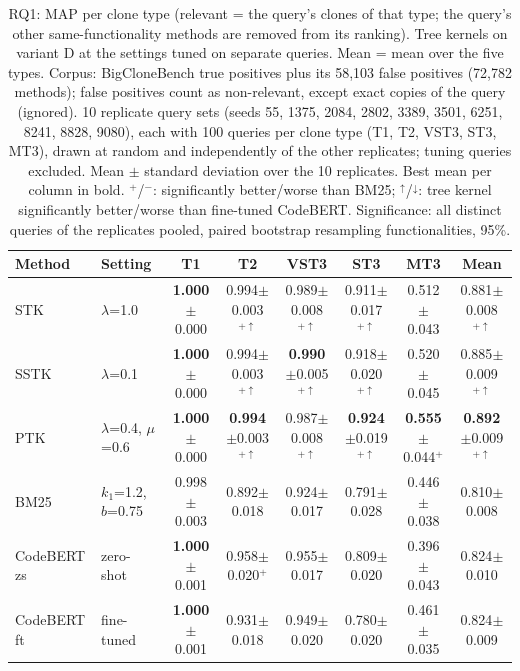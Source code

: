 \begin{table}[t]
\centering
\caption{RQ1: MAP per clone type (relevant = the query's clones of that type; the query's other same-functionality methods are removed from its ranking). Tree kernels on variant D at the settings tuned on separate queries. Mean = mean over the five types. Corpus: BigCloneBench true positives plus its 58,103 false positives (72,782 methods); false positives count as non-relevant, except exact copies of the query (ignored). 10 replicate query sets (seeds 55, 1375, 2084, 2802, 3389, 3501, 6251, 8241, 8828, 9080), each with 100 queries per clone type (T1, T2, VST3, ST3, MT3), drawn at random and independently of the other replicates; tuning queries excluded. Mean $\pm$ standard deviation over the 10 replicates. Best mean per column in bold. $^{+}$/$^{-}$: significantly better/worse than BM25; $^{\uparrow}$/$^{\downarrow}$: tree kernel significantly better/worse than fine-tuned CodeBERT. Significance: all distinct queries of the replicates pooled, paired bootstrap resampling functionalities, 95\%.}
\label{tab:rq1}
\footnotesize
\setlength{\tabcolsep}{3.5pt}
\begin{tabular}{llcccccc}
\toprule
Method & Setting & T1 & T2 & VST3 & ST3 & MT3 & Mean \\
\midrule
STK & $\lambda$=1.0 & \textbf{1.000}$\pm$0.000 & 0.994$\pm$0.003$^{+\uparrow}$ & 0.989$\pm$0.008$^{+\uparrow}$ & 0.911$\pm$0.017$^{+\uparrow}$ & 0.512$\pm$0.043 & 0.881$\pm$0.008$^{+\uparrow}$ \\
SSTK & $\lambda$=0.1 & \textbf{1.000}$\pm$0.000 & 0.994$\pm$0.003$^{+\uparrow}$ & \textbf{0.990}$\pm$0.005$^{+\uparrow}$ & 0.918$\pm$0.020$^{+\uparrow}$ & 0.520$\pm$0.045 & 0.885$\pm$0.009$^{+\uparrow}$ \\
PTK & $\lambda$=0.4, $\mu$=0.6 & \textbf{1.000}$\pm$0.000 & \textbf{0.994}$\pm$0.003$^{+\uparrow}$ & 0.987$\pm$0.008$^{+\uparrow}$ & \textbf{0.924}$\pm$0.019$^{+\uparrow}$ & \textbf{0.555}$\pm$0.044$^{+}$ & \textbf{0.892}$\pm$0.009$^{+\uparrow}$ \\
\midrule
BM25 & $k_1$=1.2, $b$=0.75 & 0.998$\pm$0.003 & 0.892$\pm$0.018 & 0.924$\pm$0.017 & 0.791$\pm$0.028 & 0.446$\pm$0.038 & 0.810$\pm$0.008 \\
CodeBERT zs & zero-shot & \textbf{1.000}$\pm$0.001 & 0.958$\pm$0.020$^{+}$ & 0.955$\pm$0.017 & 0.809$\pm$0.020 & 0.396$\pm$0.043 & 0.824$\pm$0.010 \\
CodeBERT ft & fine-tuned & \textbf{1.000}$\pm$0.001 & 0.931$\pm$0.018 & 0.949$\pm$0.020 & 0.780$\pm$0.020 & 0.461$\pm$0.035 & 0.824$\pm$0.009 \\
\bottomrule
\end{tabular}
\end{table}
